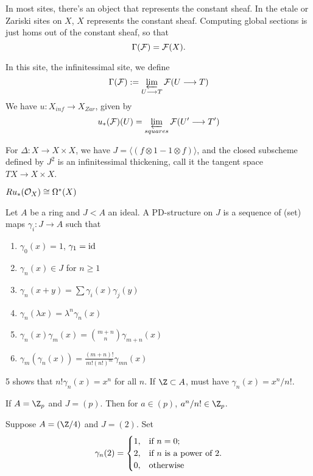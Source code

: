 \documentclass[11pt]{article}
\begin{document}
\begin{SaulCrystallineCohomology}
In most sites, there's an object that represents the constant sheaf. In the etale or Zariski sites on $X$, $X$ represents the constant sheaf. Computing global sections is just homs out of the constant sheaf, so that
\[\Gamma(\mathcal{F})=\mathcal{F}(X).\]

In this site, the infinitessimal site, we define
\[\Gamma(\mathcal{F}):=\varprojlim_{U\longrightarrow T}\mathcal{F}(U\longrightarrow T)\]
We have $u:X_{inf}\to X_{Zar}$, given by
\[u_*(\mathcal{F})(U)=\varprojlim_{squares}\mathcal{F}(U'\longrightarrow T')\]

\begin{exmp*}
For $\Delta:X\to X\times X$, we have $J=\langle (f\otimes1-1\otimes f)\rangle$, and the closed subscheme defined by $J^2$ is an infinitessimal thickening, call it the tangent space $TX\to X\times X$.
\end{exmp*}
\begin{prop*}
$Ru_*(\mathcal{O}_X)\cong\Omega^*(X)$
\end{prop*}
\begin{defn*}
Let $A$ be a ring and $J< A$ an ideal. A PD-structure on $J$ is a sequence of (set) maps $\gamma_i:J\to A$ such that
\begin{enumerate}\squishlist
\item $\gamma_0(x)=1$, $\gamma_1=\textup{id}$
\item $\gamma_n(x)\in J$ for $n\geq1$
\item $\gamma_n(x+y)=\sum \gamma_i(x)\gamma_j(y)$
\item $\gamma_n(\lambda x)=\lambda^n\gamma_n(x)$
\item $\gamma_n(x)\gamma_m(x)={m+n\choose n}\gamma_{m+n}(x)$
\item $\gamma_m(\gamma_n(x))=\frac{(m+n)!}{m!(n!)^m}\gamma_{mn}(x)$
\end{enumerate}
\end{defn*}
\begin{exmp*}
5 shows that $n!\gamma_n(x)=x^n$ for all $n$. If $\Z\subset A$, must have $\gamma_n(x)=x^n/n!$.
\end{exmp*}
\begin{exmp*}
If $A=\Z_p$ and $J=(p)$. Then for $a\in(p)$, $a^n/n!\in\Z_p$.
\end{exmp*}
\begin{exmp*}
Suppose $A=(\Z/4)$ and $J=(2)$. Set
\[\gamma_n(2)=\begin{cases}
1,&\textup{if }n=0;\\
2,&\textup{if }n\textup{ is a power of 2}.
\\0,&\textup{otherwise}

\end{cases}\]
\end{exmp*}
\end{SaulCrystallineCohomology}
\end{document}
